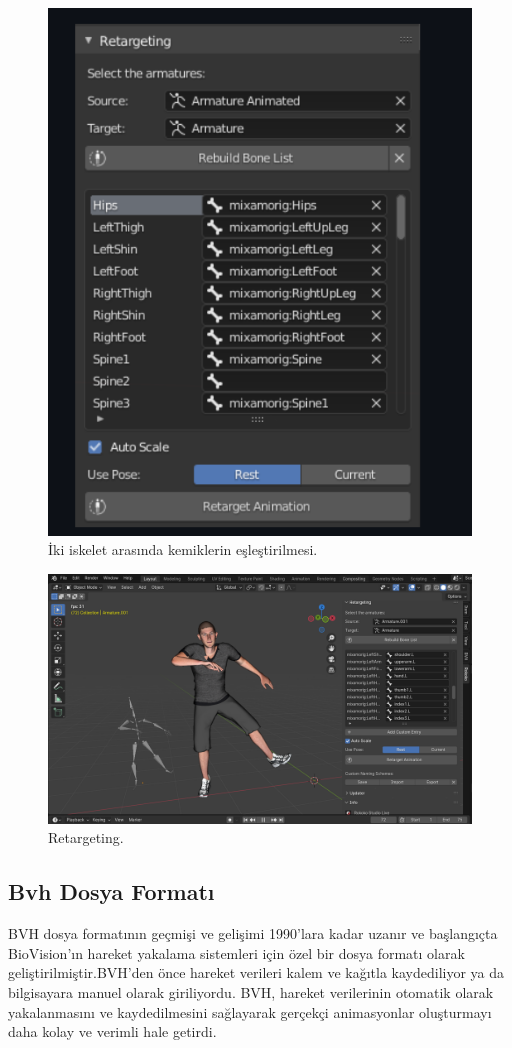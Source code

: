 \documentclass[12pt, a4paper]{article}
\begin{document}
\begin{figure}[h]
	\centering
	\includegraphics[width=6 cm , height= 7 cm]{rokoko4.png}
	\caption{İki iskelet arasında kemiklerin eşleştirilmesi.}
\end{figure}
\begin{figure}[h]
	\centering
	\includegraphics[width= 15 cm , height= 10 cm]{pose2.png}
	\caption{Retargeting.}
\end{figure}



\subsection{Bvh Dosya Formatı}
BVH dosya formatının geçmişi ve gelişimi 1990'lara kadar uzanır ve başlangıçta BioVision'ın hareket yakalama sistemleri için özel bir dosya formatı olarak geliştirilmiştir.BVH'den önce hareket verileri kalem ve kağıtla kaydediliyor ya da bilgisayara manuel olarak giriliyordu. BVH, hareket verilerinin otomatik olarak yakalanmasını ve kaydedilmesini sağlayarak gerçekçi animasyonlar oluşturmayı daha kolay ve verimli hale getirdi.
\end{document}
